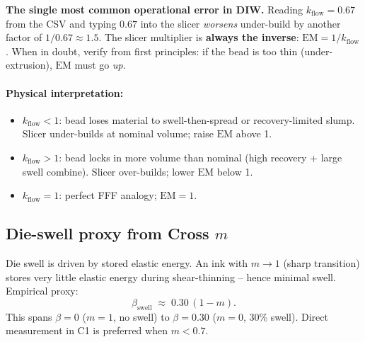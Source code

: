 \documentclass[11pt,a4paper]{article}
\begin{document}
\begin{warningbox}
\textbf{The single most common operational error in DIW.}
Reading $k_\mathrm{flow}=0.67$ from the CSV and typing $0.67$ into
the slicer \emph{worsens} under-build by another factor of $1/0.67
\approx 1.5$. The slicer multiplier is \textbf{always the inverse}:
$\mathrm{EM}=1/k_\mathrm{flow}$. When in doubt, verify from first
principles: if the bead is too thin (under-extrusion), $\mathrm{EM}$
must go \emph{up}.
\end{warningbox}

\paragraph{Physical interpretation:}
\begin{itemize}[leftmargin=1.4em,itemsep=2pt]
\item $k_\mathrm{flow}<1$: bead loses material to swell-then-spread or
  recovery-limited slump. Slicer under-builds at nominal volume; raise
  $\mathrm{EM}$ above 1.
\item $k_\mathrm{flow}>1$: bead locks in more volume than nominal
  (high recovery + large swell combine). Slicer over-builds; lower
  $\mathrm{EM}$ below 1.
\item $k_\mathrm{flow}=1$: perfect FFF analogy; $\mathrm{EM}=1$.
\end{itemize}

\subsection{Die-swell proxy from Cross $m$}

Die swell is driven by stored elastic energy. An ink with $m\to 1$
(sharp transition) stores very little elastic energy during
shear-thinning -- hence minimal swell. Empirical proxy:
\begin{equation}
\beta_\mathrm{swell} \;\approx\; 0.30\,(1-m).
\label{eq:beta_proxy}
\end{equation}
This spans $\beta=0$ ($m=1$, no swell) to $\beta=0.30$ ($m=0$, 30\%
swell). Direct measurement in C1 is preferred when $m<0.7$.
\end{document}
